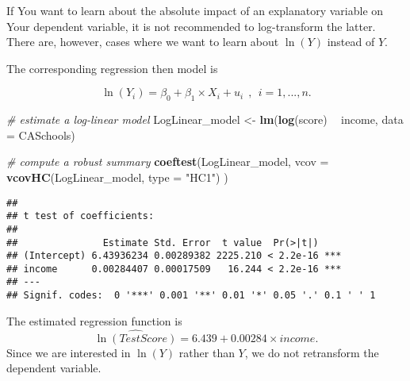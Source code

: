 \documentclass[]{book}
\newenvironment{Shaded}{\begin{snugshade}}{\end{snugshade}}
\newcommand{\KeywordTok}[1]{\textcolor[rgb]{0.13,0.29,0.53}{\textbf{#1}}}
\newcommand{\DataTypeTok}[1]{\textcolor[rgb]{0.13,0.29,0.53}{#1}}
\newcommand{\DecValTok}[1]{\textcolor[rgb]{0.00,0.00,0.81}{#1}}
\newcommand{\StringTok}[1]{\textcolor[rgb]{0.31,0.60,0.02}{#1}}
\newcommand{\CommentTok}[1]{\textcolor[rgb]{0.56,0.35,0.01}{\textit{#1}}}
\newcommand{\OperatorTok}[1]{\textcolor[rgb]{0.81,0.36,0.00}{\textbf{#1}}}
\newcommand{\NormalTok}[1]{#1}
\theoremstyle{definition}
\theoremstyle{definition}
\theoremstyle{definition}
\theoremstyle{remark}
\begin{document}
If You want to learn about the absolute impact of an explanatory
variable on Your dependent variable, it is not recommended to
log-transform the latter. There are, however, cases where we want to
learn about \(\ln(Y)\) instead of \(Y\).

The corresponding regression then model is

\[ \ln(Y_i) = \beta_0 + \beta_1 \times X_i + u_i \ \ , \ \ i=1,...,n. \]

\begin{Shaded}
\begin{Highlighting}[]
\CommentTok{# estimate a log-linear model }
\NormalTok{LogLinear_model <-}\StringTok{ }\KeywordTok{lm}\NormalTok{(}\KeywordTok{log}\NormalTok{(score) }\OperatorTok{~}\StringTok{ }\NormalTok{income, }\DataTypeTok{data =}\NormalTok{ CASchools)}

\CommentTok{# compute a robust summary}
\KeywordTok{coeftest}\NormalTok{(LogLinear_model, }
         \DataTypeTok{vcov =} \KeywordTok{vcovHC}\NormalTok{(LogLinear_model, }\DataTypeTok{type =} \StringTok{"HC1"}\NormalTok{)}
\NormalTok{         )}
\end{Highlighting}
\end{Shaded}

\begin{verbatim}
## 
## t test of coefficients:
## 
##               Estimate Std. Error  t value  Pr(>|t|)    
## (Intercept) 6.43936234 0.00289382 2225.210 < 2.2e-16 ***
## income      0.00284407 0.00017509   16.244 < 2.2e-16 ***
## ---
## Signif. codes:  0 '***' 0.001 '**' 0.01 '*' 0.05 '.' 0.1 ' ' 1
\end{verbatim}

The estimated regression function is
\[\widehat{\ln(TestScore)} = 6.439 + 0.00284 \times income.\] Since we
are interested in \(\ln(Y)\) rather than \(Y\), we do not retransform
the dependent variable.

\begin{Shaded}
\end{Shaded}
\end{document}
